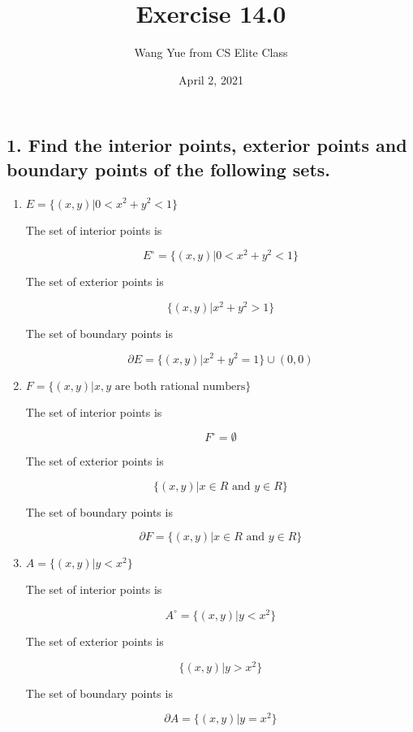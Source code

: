 \documentclass{article}
\begin{document}
    \title{Exercise 14.0}
    \author{Wang Yue from CS Elite Class}
    \date{April 2, 2021}
    \maketitle

    \subsection*{1. Find the interior points, exterior points and boundary points of the following sets.}

    \begin{enumerate}[(1)]
        \item $E = \{ (x,y) | 0 < x^2 + y^2 < 1 \}$

        The set of interior points is

        $$E^\circ = \{ (x, y) | 0 < x^2 + y^2 < 1 \}$$

        The set of exterior points is

        $$\{  (x, y) | x^2 + y^2 > 1 \}$$

        The set of boundary points is

        $$\partial E = \{  (x, y) | x^2+y^2=1 \} \cup (0, 0)$$

        \item $F = \{ (x, y) | x, y \textrm{ are both rational numbers} \}$

        The set of interior points is

        $$F^\circ = \emptyset$$

        The set of exterior points is

        $$\{  (x, y) | x \in R \textrm{ and } y \in R \}$$

        The set of boundary points is

        $$\partial F = \{  (x, y) | x \in R \textrm{ and } y \in R \}$$

        \item $A = \{  (x, y) | y < x^2 \}$

        The set of interior points is

        $$A^\circ = \{ (x, y) | y < x^2 \}$$

        The set of exterior points is

        $$\{  (x, y) | y > x^2 \}$$

        The set of boundary points is

        $$\partial A = \{  (x, y) | y = x^2 \}$$


\end{enumerate}
\end{document}
